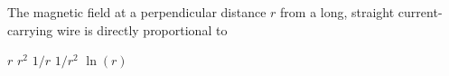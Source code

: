 
\begin{questions}
\setcounter{question}{18}
\question
The magnetic field at a perpendicular distance $r$ from a long, straight current-carrying wire is directly proportional to

\begin{oneparchoices}
    \choice $r$
    \choice $r^{2}$
    \choice $1 / r$
    \choice $1 / r^{2}$
    \choice $\ln (r)$
\end{oneparchoices}
\end{questions}
